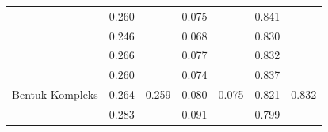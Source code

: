 \documentclass[conference]{IEEEtran}
\begin{document}
\begin{table}[]
\begin{tabular}{|l|cc|cc|cc|}
                                                      & \multicolumn{1}{c|}{0.260}                         & \cellcolor[HTML]{FFFFFF}                         & \multicolumn{1}{c|}{0.075}                         & \cellcolor[HTML]{FFFFFF}                           & \multicolumn{1}{c|}{0.841}                         & \cellcolor[HTML]{FFFFFF}                        \\ \cline{2-2} \cline{4-4} \cline{6-6}
                                                      & \multicolumn{1}{l|}{0.246}                         & \cellcolor[HTML]{FFFFFF}                         & \multicolumn{1}{l|}{0.068}                         & \cellcolor[HTML]{FFFFFF}                           & \multicolumn{1}{l|}{0.830}                         & \cellcolor[HTML]{FFFFFF}                        \\ \cline{2-2} \cline{4-4} \cline{6-6}
                                                      & \multicolumn{1}{l|}{0.266}                         & \cellcolor[HTML]{FFFFFF}                         & \multicolumn{1}{l|}{0.077}                          & \cellcolor[HTML]{FFFFFF}                           & \multicolumn{1}{l|}{0.832}                         & \cellcolor[HTML]{FFFFFF}                        \\ \cline{2-2} \cline{4-4} \cline{6-6}
                                                      & \multicolumn{1}{l|}{0.260}                         & \cellcolor[HTML]{FFFFFF}                         & \multicolumn{1}{l|}{0.074}                         & \cellcolor[HTML]{FFFFFF}                           & \multicolumn{1}{l|}{0.837}                         & \cellcolor[HTML]{FFFFFF}                        \\ \cline{2-2} \cline{4-4} \cline{6-6}
  \multirow{-5}{*}{Bentuk Kompleks}         & \multicolumn{1}{l|}{0.264}                         & \multirow{-5}{*}{\cellcolor[HTML]{FFFFFF}0.259} & \multicolumn{1}{l|}{0.080}                         & \multirow{-5}{*}{\cellcolor[HTML]{FFFFFF}0.075} & \multicolumn{1}{l|}{0.821}                         & \multirow{-5}{*}{\cellcolor[HTML]{FFFFFF}0.832} \\ \hline
                                                      & \multicolumn{1}{c|}{\cellcolor[HTML]{FFFFFF}0.283} & \cellcolor[HTML]{FFFFFF}                         & \multicolumn{1}{c|}{\cellcolor[HTML]{FFFFFF}0.091} & \cellcolor[HTML]{FFFFFF}                           & \multicolumn{1}{c|}{\cellcolor[HTML]{FFFFFF}0.799} & \cellcolor[HTML]{FFFFFF}                        \\ \cline{2-2} \cline{4-4} \cline{6-6}

\end{tabular}
\end{table}
\end{document}
